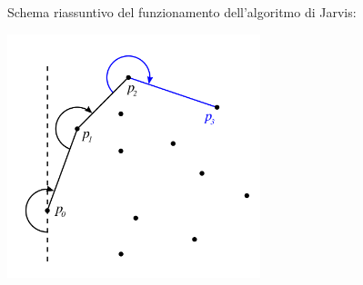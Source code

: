 \documentclass[../cheatSheetAlgoritmi.tex]{subfiles}
\begin{document}
Schema riassuntivo del funzionamento dell'algoritmo di Jarvis:
\begin{center}
	\includegraphics{../img/backtracking_inviluppo_convesso_jarvis}
\end{center}
\end{document}
